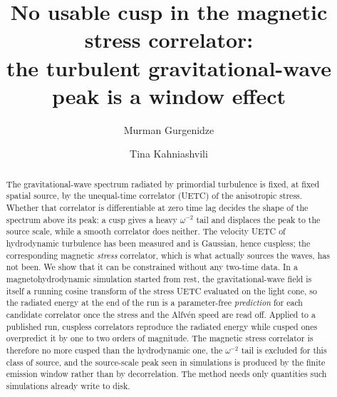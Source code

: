 \documentclass[prd,twocolumn,aps,nobibnotes,superscriptaddress,preprintnumbers,floatfix]{revtex4-1}
\begin{document}
\title{No usable cusp in the magnetic stress correlator:\\
       the turbulent gravitational-wave peak is a window effect}

\author{Murman Gurgenidze}

\author{Tina Kahniashvili}

\begin{abstract}
The gravitational-wave spectrum radiated by primordial turbulence is fixed, at fixed
spatial source, by the unequal-time correlator (UETC) of the anisotropic stress. Whether
that correlator is differentiable at zero time lag decides the shape of the spectrum
above its peak: a cusp gives a heavy $\omega^{-2}$ tail and displaces the peak to the
source scale, while a smooth correlator does neither. The velocity UETC of hydrodynamic
turbulence has been measured and is Gaussian, hence cuspless; the corresponding magnetic
\emph{stress} correlator, which is what actually sources the waves, has not been. We show
that it can be constrained without any two-time data. In a magnetohydrodynamic simulation
started from rest, the gravitational-wave field is itself a running cosine transform of
the stress UETC evaluated on the light cone, so the radiated energy at the end of the run
is a parameter-free \emph{prediction} for each candidate correlator once the stress and
the Alfv\'en speed are read off. Applied to a published run, cuspless correlators
reproduce the radiated energy while cusped ones overpredict it by one to two orders of
magnitude. The magnetic stress correlator is therefore no more cusped than the
hydrodynamic one, the $\omega^{-2}$ tail is excluded for this class of source, and the
source-scale peak seen in simulations is produced by the finite emission window rather
than by decorrelation. The method needs only quantities such simulations already write to
disk.
\end{abstract}

\maketitle
\end{document}
